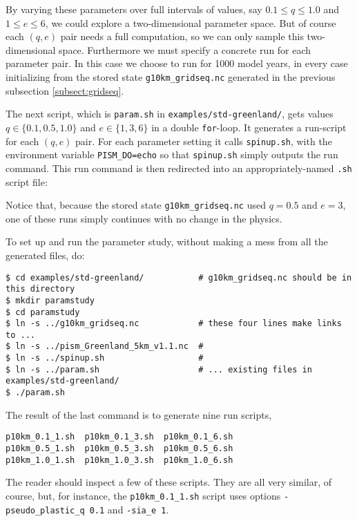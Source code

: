 By varying these parameters over full intervals of values, say $0.1\le q \le 1.0$ and $1 \le e \le 6$, we could explore a two-dimensional parameter space.  But of course each $(q,e)$ pair needs a full computation, so we can only sample this two-dimensional space.  Furthermore we must specify a concrete run for each parameter pair.  In this case we choose to run for 1000 model years, in every case initializing from the stored state \texttt{g10km_gridseq.nc} generated in the previous subsection \ref{subsect:gridseq}.

The next script, which is \texttt{param.sh} in \texttt{examples/std-greenland/}, gets values $q\in\{0.1,0.5,1.0\}$ and $e\in\{1,3,6\}$ in a double \texttt{for}-loop.  It generates a run-script for each $(q,e)$ pair.  For each parameter setting it calls \texttt{spinup.sh}, with the environment variable \texttt{PISM_DO=echo} so that \texttt{spinup.sh} simply outputs the run command.  This run command is then redirected into an appropriately-named \texttt{.sh} script file:
Notice that, because the stored state \texttt{g10km_gridseq.nc} used $q=0.5$ and $e=3$, one of these runs simply  continues with no change in the physics.

To set up and run the parameter study, without making a mess from all the generated files, do:
\small
\begin{verbatim}
$ cd examples/std-greenland/           # g10km_gridseq.nc should be in this directory
$ mkdir paramstudy
$ cd paramstudy
$ ln -s ../g10km_gridseq.nc            # these four lines make links to ...
$ ln -s ../pism_Greenland_5km_v1.1.nc  #
$ ln -s ../spinup.sh                   #
$ ln -s ../param.sh                    # ... existing files in examples/std-greenland/
$ ./param.sh
\end{verbatim}
\normalsize
The result of the last command is to generate nine run scripts,
\small
\begin{verbatim}
p10km_0.1_1.sh  p10km_0.1_3.sh  p10km_0.1_6.sh
p10km_0.5_1.sh  p10km_0.5_3.sh  p10km_0.5_6.sh
p10km_1.0_1.sh  p10km_1.0_3.sh  p10km_1.0_6.sh
\end{verbatim}
\normalsize
The reader should inspect a few of these scripts.  They are all very similar, of course, but, for instance, the \texttt{p10km_0.1_1.sh} script uses options \texttt{-pseudo_plastic_q 0.1} and \texttt{-sia_e 1}.

